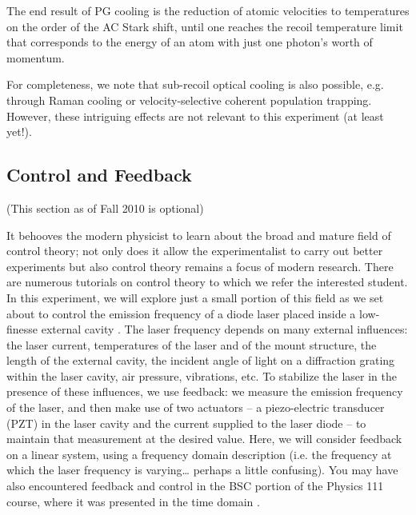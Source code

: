 \documentclass{../lab}
\begin{document}
The end result of PG cooling is the reduction of atomic velocities to temperatures on the order of the AC Stark shift, until one reaches the recoil temperature limit that corresponds to the energy of an atom with just one photon’s worth of momentum.

For completeness, we note that sub-recoil optical cooling is also possible, e.g. through Raman cooling or velocity-selective coherent population trapping. However, these intriguing effects are not relevant to this experiment (at least yet!).

\subsection{Control and Feedback}

(This section as of Fall 2010 is optional)

It behooves the modern physicist to learn about the broad and mature field of control theory; not only does it allow the experimentalist to carry out better experiments but also control theory remains a focus of modern research. There are numerous tutorials on control theory \cite{DiStefano,Dorf,Bechhoefer} to which we refer the interested student. In this experiment, we will explore just a small portion of this field as we set about to control the emission frequency of a diode laser placed inside a low-finesse external cavity \cite{Wieman}. The laser frequency depends on many external influences: the laser current, temperatures of the laser and of the mount structure, the length of the external cavity, the incident angle of light on a diffraction grating within the laser cavity, air pressure, vibrations, etc. To stabilize the laser in the presence of these influences, we use feedback: we measure the emission frequency of the laser, and then make use of two actuators – a piezo-electric transducer (PZT) in the laser cavity and the current supplied to the laser diode – to maintain that measurement at the desired value. Here, we will consider feedback on a linear system, using a frequency domain description (i.e. the frequency at which the laser frequency is varying… perhaps a little confusing). You may have also encountered feedback and control in the BSC portion of the Physics 111 course, where it was presented in the time domain \cite{BSCWriteup}.
\end{document}
